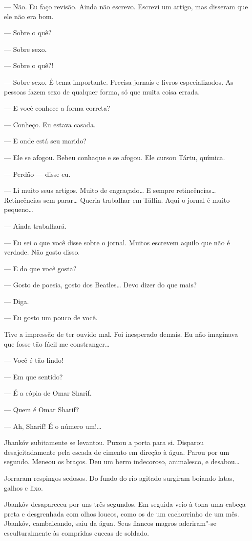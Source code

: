 --- Não. Eu faço revisão. Ainda não escrevo. Escrevi um artigo,
mas disseram que ele não era bom.

--- Sobre o quê?

--- Sobre sexo.

--- Sobre o quê?!

--- Sobre sexo. É tema importante. Precisa jornais e livros
especializados. As pessoas fazem sexo de qualquer forma, só que muita
coisa errada.

--- E você conhece a forma correta?

--- Conheço. Eu estava casada.

--- E onde está seu marido?

--- Ele se afogou. Bebeu conhaque e se afogou. Ele cursou Tártu,
química.

--- Perdão --- disse eu.

--- Li muito seus artigos. Muito de engraçado\ldots{} E sempre
retincências\ldots{} Retincências sem parar\ldots{} Queria trabalhar em
Tállin. Aqui o jornal é muito pequeno\ldots{}

--- Ainda trabalhará.

--- Eu sei o que você disse sobre o jornal. Muitos escrevem
aquilo que não é verdade. Não gosto disso.

--- E do que você gosta?

--- Gosto de poesia, gosto dos Beatles\ldots{} Devo dizer do que mais?

--- Diga.

--- Eu gosto um pouco de você.

Tive a impressão de ter ouvido mal. Foi inesperado demais. Eu não
imaginava que fosse tão fácil me constranger\ldots{}

--- Você é tão lindo!

--- Em que sentido?

--- É a cópia de Omar Sharif.

--- Quem é Omar Sharif?

--- Ah, Sharif! É o número um!\ldots{}

Jbankóv subitamente se levantou. Puxou a porta para si. Disparou
desajeitadamente pela escada de cimento em direção à água. Parou por um
segundo. Meneou os braços. Deu um berro indecoroso, animalesco, e
desabou\ldots{}

Jorraram respingos sedosos. Do fundo do rio agitado surgiram boiando
latas, galhos e lixo.

Jbankóv desapareceu por uns três segundos. Em seguida veio à tona uma
cabeça preta e desgrenhada com olhos loucos, como os de um cachorrinho
de um mês. Jbankóv, cambaleando, saiu da água. Seus flancos magros
aderiram"-se esculturalmente às compridas cuecas de soldado.

